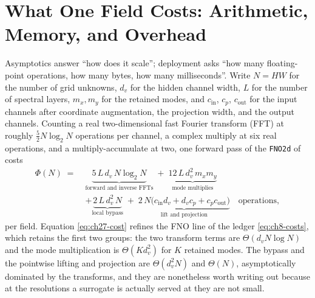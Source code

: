 \section{What One Field Costs: Arithmetic, Memory, and Overhead}
\label{sec:ch27-cost}

Asymptotics answer ``how does it scale''; deployment asks ``how many
floating-point operations, how many bytes, how many milliseconds''. Write $N = HW$
for the number of grid unknowns, $d_v$ for the hidden channel width, $L$ for the
number of spectral layers, $m_x, m_y$ for the retained modes, and $c_{\mathrm{in}}$,
$c_p$, $c_{\mathrm{out}}$ for the input channels after coordinate augmentation, the
projection width, and the output channels. Counting a real two-dimensional fast
Fourier transform (FFT) at roughly $\tfrac{5}{2}N\log_2 N$ operations per channel, a
complex multiply at six real operations, and a multiply-accumulate at two, one forward
pass of the \texttt{FNO2d} of
 costs
\begin{equation}
  \label{eq:ch27-cost}
  \begin{aligned}
    \Phi(N) \;=\;
    & \underbrace{5\,L\,d_v\,N\log_2 N}_{\text{forward and inverse FFTs}}
      \;+\; \underbrace{12\,L\,d_v^{2}\,m_x m_y}_{\text{mode multiplies}} \\
    & + \underbrace{2\,L\,d_v^{2}\,N}_{\text{local bypass}}
      \;+\; \underbrace{2\,N\big(c_{\mathrm{in}}d_v + d_v c_p + c_p c_{\mathrm{out}}\big)}_{\text{lift and projection}}
      \quad \text{operations},
  \end{aligned}
\end{equation}
per field. Equation \eqref{eq:ch27-cost} refines the FNO line of the ledger
\eqref{eq:ch8-costs}, which retains the first two groups: the two transform terms
are $\Theta(d_v N\log N)$ and the mode multiplication is $\Theta(K d_v^2)$ for
$K$ retained modes. The bypass and the pointwise lifting and projection are
$\Theta(d_v^2 N)$ and $\Theta(N)$, asymptotically dominated by the transforms, and
they are nonetheless worth writing out because at the resolutions a surrogate is
actually served at they are not small.

